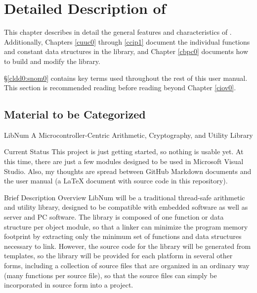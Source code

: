 \chapter{Detailed Description of \emph{\productbasenameshort{}}}
\label{cldd0}

This chapter describes in detail the general features and characteristics
of \emph{\productbasenameshort{}}\@.  Additionally, Chapters \ref{cuuc0}
through \ref{ccip1} document the individual functions and constant data
structures in the library, and Chapter \ref{cbpc0} documents how to build
and modify the library.

\S{}\ref{cldd0:snom0} contains key terms used throughout the rest of this
user manual.  This section is recommended reading before reading beyond
Chapter \ref{ciov0}.

\section{Material to be Categorized}
\label{cldd0:smca0}


LibNum
A Microcontroller-Centric Arithmetic, Cryptography, and Utility Library

Current Status
This project is just getting started, so nothing is usable yet. At this time, there are just a few modules designed to be used in Microsoft Visual Studio. Also, my thoughts are spread between GitHub Markdown documents and the user manual (a LaTeX document with source code in this repository).

Brief Description
Overview
LibNum will be a traditional thread-safe arithmetic and utility library, designed to be compatible with embedded software as well as server and PC software. The library is composed of one function or data structure per object module, so that a linker can minimize the program memory footprint by extracting only the minimum set of functions and data structures necessary to link. However, the source code for the library will be generated from templates, so the library will be provided for each platform in several other forms, including a collection of source files that are organized in an ordinary way (many functions per source file), so that the source files can simply be incorporated in source form into a project.

